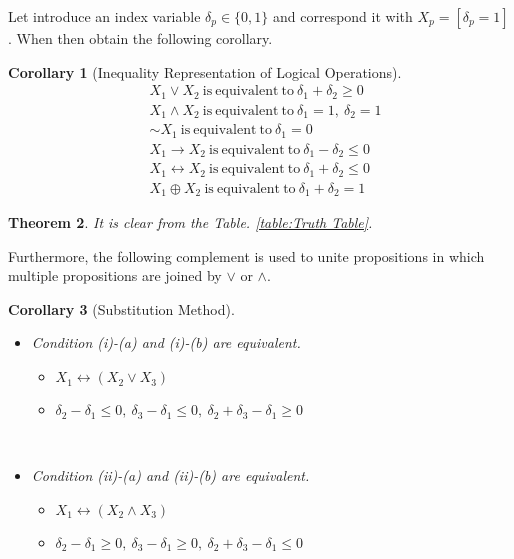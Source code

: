 \documentclass[]{interact}
\theoremstyle{plain}%
\newtheorem{theorem}{Theorem}[section]
\newtheorem{corollary}[theorem]{Corollary}
\theoremstyle{definition}
\theoremstyle{remark}
\begin{document}
Let introduce an index variable $\delta_p\in\{0,1\}$ and correspond it with $X_p=[\delta_p=1]$.
When then obtain the following corollary.
\begin{corollary}[Inequality Representation of Logical Operations]
    \begin{align}
        &X_1\vee X_2~\mathrm{is~equivalent~to}~\delta_1 + \delta_2 \ge 0\\
        &X_1\wedge X_2~\mathrm{is~equivalent~to}~\delta_1=1,~\delta_2=1\\
        &\sim X_1~\mathrm{is~equivalent~to}~\delta_1 = 0\\
        &X_1\rightarrow X_2~\mathrm{is~equivalent~to}~\delta_1 - \delta_2 \le 0\\
        &X_1\leftrightarrow X_2~\mathrm{is~equivalent~to}~\delta_1 + \delta_2 \le 0\\
        &X_1\oplus X_2~\mathrm{is~equivalent~to}~\delta_1 + \delta_2 = 1
    \end{align}
\end{corollary}
\begin{theorem}
    It is clear from the Table. \ref{table:Truth Table}.
\end{theorem}
Furthermore, the following complement is used to unite propositions in which multiple propositions are joined by $\vee$ or $\wedge$.
\begin{corollary}[Substitution Method]\mbox{}\\
    \begin{itemize}
        \item[(i)] Condition (i)-(a) and (i)-(b) are equivalent.\mbox{}\\
            \begin{itemize}
                \item[(a)]$X_1\leftrightarrow(X_2\vee X_3)$\\
                \item[(b)] $\delta_2-\delta_1\le 0,~\delta_3-\delta_1\le 0,~\delta_2+\delta_3-\delta_1\ge 0$
            \end{itemize}
            \mbox{}\\
        \item[(ii)] Condition (ii)-(a) and (ii)-(b) are equivalent.\mbox{}\\
            \begin{itemize}
                \item[(a)]$X_1\leftrightarrow(X_2\wedge X_3)$\\
                \item[(b)] $\delta_2-\delta_1\ge 0,~\delta_3-\delta_1\ge 0,~\delta_2+\delta_3-\delta_1\le 0$
            \end{itemize}
            \mbox{}\\
    \end{itemize}
\end{corollary}
\end{document}
